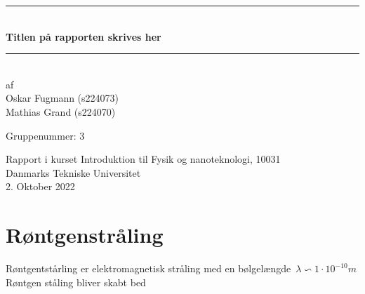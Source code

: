 \documentclass[a4paper,twoside]{article}
\begin{document}
\begin{titlepage}
\centering
\rule{\textwidth}{1mm}\\
\vspace{1cm}
\Huge\bfseries Titlen på rapporten skrives her\\
\vspace{0.7cm}
\rule{\textwidth}{1mm}\\
\vspace{3cm}
\large af\\
Oskar Fugmann (s224073)\\
Mathias Grand (s224070)\\


\vspace{0.7cm}


Gruppenummer: 3
\normalsize
\begin{flushleft}
Rapport i kurset Introduktion til Fysik og nanoteknologi, 10031\\
Danmarks Tekniske Universitet\\
2. Oktober 2022
\end{flushleft}
\end{titlepage}

\tableofcontents
\thispagestyle{empty} 
\newpage %

\section{Røntgenstråling}
\setcounter{page}{1} 
Røntgentstårling er elektromagnetisk stråling med en bølgelængde\
$\lambda \backsim 1\cdot 10^{-10}$$m$\\
Røntgen ståling bliver skabt bed 
\end{document}
